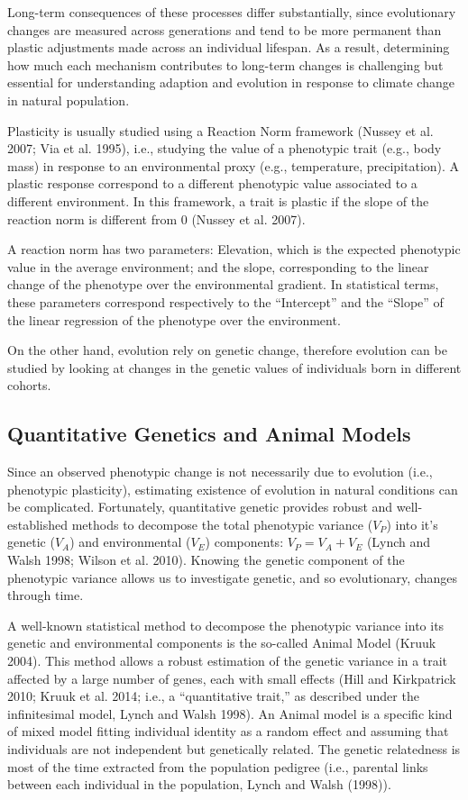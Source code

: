 \documentclass[
  12pt,
  letterpaper,
]{scrartcl}
\begin{document}
Long-term consequences of these processes differ substantially, since
evolutionary changes are measured across generations and tend to be more
permanent than plastic adjustments made across an individual lifespan.
As a result, determining how much each mechanism contributes to
long-term changes is challenging but essential for understanding
adaption and evolution in response to climate change in natural
population.

Plasticity is usually studied using a Reaction Norm framework (Nussey et
al. 2007; Via et al. 1995), i.e., studying the value of a phenotypic
trait (e.g., body mass) in response to an environmental proxy (e.g.,
temperature, precipitation). A plastic response correspond to a
different phenotypic value associated to a different environment. In
this framework, a trait is plastic if the slope of the reaction norm is
different from 0 (Nussey et al. 2007).

A reaction norm has two parameters: Elevation, which is the expected
phenotypic value in the average environment; and the slope,
corresponding to the linear change of the phenotype over the
environmental gradient. In statistical terms, these parameters
correspond respectively to the ``Intercept'' and the ``Slope'' of the
linear regression of the phenotype over the environment.

On the other hand, evolution rely on genetic change, therefore evolution
can be studied by looking at changes in the genetic values of
individuals born in different cohorts.

\subsection{Quantitative Genetics and Animal
Models}\label{quantitative-genetics-and-animal-models}

Since an observed phenotypic change is not necessarily due to evolution
(i.e., phenotypic plasticity), estimating existence of evolution in
natural conditions can be complicated. Fortunately, quantitative genetic
provides robust and well-established methods to decompose the total
phenotypic variance (\(V_P\)) into it's genetic (\(V_A\)) and
environmental (\(V_{E}\)) components: \(V_P = V_A + V_{E}\) (Lynch and
Walsh 1998; Wilson et al. 2010). Knowing the genetic component of the
phenotypic variance allows us to investigate genetic, and so
evolutionary, changes through time.

A well-known statistical method to decompose the phenotypic variance
into its genetic and environmental components is the so-called Animal
Model (Kruuk 2004). This method allows a robust estimation of the
genetic variance in a trait affected by a large number of genes, each
with small effects (Hill and Kirkpatrick 2010; Kruuk et al. 2014; i.e.,
a ``quantitative trait,'' as described under the infinitesimal model,
Lynch and Walsh 1998). An Animal model is a specific kind of mixed model
fitting individual identity as a random effect and assuming that
individuals are not independent but genetically related. The genetic
relatedness is most of the time extracted from the population pedigree
(i.e., parental links between each individual in the population, Lynch
and Walsh (1998)).
\end{document}
